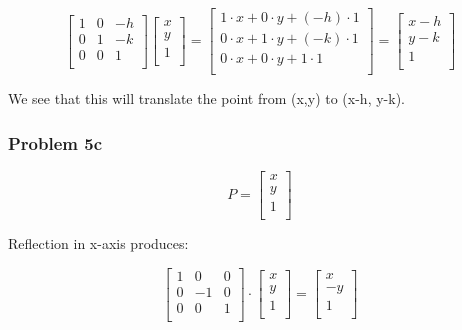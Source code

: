 \documentclass{article}
\begin{document}
\[
\left[ \begin{array}{ccc}
1 & 0 & -h \\
0 & 1 & -k \\
0 & 0 & 1 \\
\end{array} \right]
\left[ \begin{array}{c}
x \\
y \\
1 \\
\end{array} \right]
=
\left[ \begin{array}{c}
1 \cdot x + 0 \cdot y + (-h) \cdot 1 \\
0 \cdot x + 1 \cdot y + (-k) \cdot 1 \\
0 \cdot x + 0 \cdot y + 1 \cdot 1 \\
\end{array} \right]
=
\left[ \begin{array}{c}
x - h \\
y - k \\
1 \\
\end{array} \right]
\]

We see that this will translate the point from (x,y) to (x-h, y-k).

\subsubsection*{Problem 5c}

\[
  P= 
\left[ {\begin{array}{c}
    x\\
    y\\
    1\\    
  \end{array} } \right]  
\]

Reflection in x-axis produces:

\[
  \begin{bmatrix}
    1 & 0 & 0 \\
    0 & -1 & 0 \\
    0 & 0 & 1 \\
  \end{bmatrix}
  \cdot
  \begin{bmatrix}
    x \\
    y \\
    1 \\
  \end{bmatrix}
  = 
  \begin{bmatrix}
    x \\
    -y \\
    1 \\
  \end{bmatrix}
\]
\end{document}
